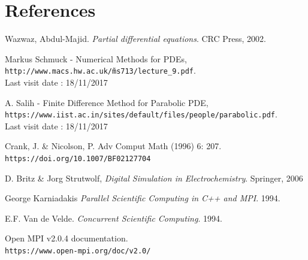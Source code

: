 \documentclass{article}
\begin{document}
        \section{References}
        \begin{thebibliography}{9}
            Wazwaz, Abdul-Majid. \textit{Partial differential equations}. CRC Press, 2002.
    
            Markus Schmuck - Numerical Methods for PDEs,
            \\\texttt{http://www.macs.hw.ac.uk/\~ms713/lecture\_9.pdf}.
            \\Last visit date : 18/11/2017
    
            A. Salih - Finite Difference Method for Parabolic PDE,
            \\\texttt{https://www.iist.ac.in/sites/default/files/people/parabolic.pdf}.
            \\Last visit date : 18/11/2017
    
            
            Crank, J. & Nicolson, P. Adv Comput Math (1996) 6: 207. 
            \\\texttt{https://doi.org/10.1007/BF02127704}
    
            D. Britz \& Jorg Strutwolf, \textit{Digital Simulation in Electrochemistry}.
            Springer, 2006

            George Karniadakis \textit{Parallel Scientific Computing in C++ and MPI}. 1994.

            E.F. Van de Velde. \textit{Concurrent Scientific Computing}. 1994.

            Open MPI v2.0.4 documentation.
            \\\texttt{https://www.open-mpi.org/doc/v2.0/}
    
            
            
        \end{thebibliography}
        \newpage
\end{document}
